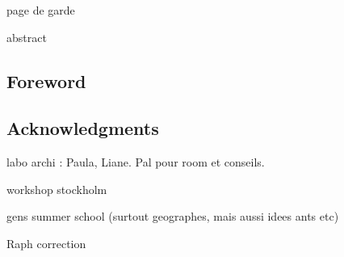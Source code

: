 \documentclass[english]{article}
\begin{document}
page de garde

\cleardoublepage{}

abstract

\newpage{}\newpage{}


\subsection*{Foreword}


\subsection*{Acknowledgments}

labo archi : Paula, Liane. Pal pour room et conseils.

workshop stockholm

gens summer school (surtout geographes, mais aussi idees ants etc)

Raph correction

\newpage{}
\end{document}
